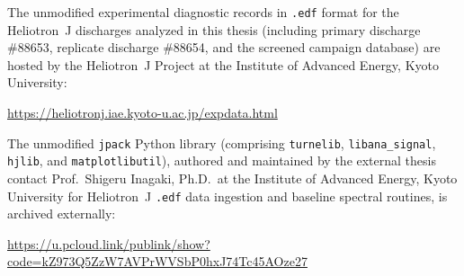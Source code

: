 \clearpage
{}
\setcounter{section}{0}
\renewcommand{\thesection}{\Alph{section}}
\renewcommand{\theHsection}{annex.\thesection}

\label{annex:data}
The unmodified experimental diagnostic records in \texttt{.edf} format for the Heliotron~J discharges analyzed in this thesis (including primary discharge \#88653, replicate discharge \#88654, and the screened campaign database) are hosted by the Heliotron~J Project at the Institute of Advanced Energy, Kyoto University:\par\smallskip\noindent
{\small\url{https://heliotronj.iae.kyoto-u.ac.jp/expdata.html}}

\label{annex:library}
The unmodified \texttt{jpack} Python library (comprising \texttt{turnelib}, \texttt{libana\_\allowbreak signal}, \texttt{hjlib}, and \texttt{matplotlibutil}), authored and maintained by the external thesis contact Prof.\ Shigeru Inagaki, Ph.D.\ at the Institute of Advanced Energy, Kyoto University for Heliotron~J \texttt{.edf} data ingestion and baseline spectral routines, is archived externally:\par\smallskip\noindent
{\small\url{https://u.pcloud.link/publink/show?code=kZ973Q5ZzW7AVPrWVSbP0hxJ74Tc45AOze27}}
